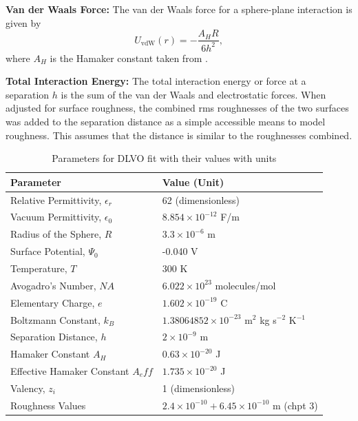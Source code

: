 \textbf{Van der Waals Force:} The van der Waals force for a sphere-plane interaction is given by
    \[
    U_{\text{vdW}}(r) = -\frac{A_H R}{6 h^2},
    \]
    where $A_H$ is the Hamaker constant taken from \cite{Bergstrom1997}.
    
\textbf{Total Interaction Energy:} The total interaction energy or force at a separation $h$ is the sum of the van der Waals and electrostatic forces. When adjusted for surface roughness, the combined rms roughnesses of the two surfaces was added to the separation distance as a simple accessible means to model roughness. This assumes that the distance is similar to the roughnesses combined. 

\begin{table}[h]
\centering
\begin{tabular}{|l|l|}
\hline
\textbf{Parameter} & \textbf{Value (Unit)} \\ \hline
Relative Permittivity, $\epsilon_r$ & 62 (dimensionless) \cite{behrends2006dielectric} \\ \hline
Vacuum Permittivity, $\epsilon_0$ & $8.854 \times 10^{-12}$ F/m \\ \hline
Radius of the Sphere, $R$ & $3.3 \times 10^{-6}$ m \\ \hline
Surface Potential, $\Psi_0$ & -0.040 V \cite{silica2021}\\ \hline
Temperature, $T$ & 300 K \\ \hline
Avogadro's Number, $NA$ & $6.022 \times 10^{23}$ molecules/mol \\ \hline
Elementary Charge, $e$ & $1.602 \times 10^{-19}$ C \\ \hline
Boltzmann Constant, $k_B$ & $1.38064852 \times 10^{-23}$ m\(^2\) kg s\(^{-2}\) K\(^{-1}\) \\ \hline
Separation Distance, $h$ & $2 \times 10^{-9}$ m \\ \hline
Hamaker Constant $A_H$ & $0.63 \times 10^{-20}$ J \cite{Bergstrom1997}\\ \hline
Effective Hamaker Constant $A_eff$ & $1.735 \times 10^{-20}$ J\\ \hline
Valency, $z_i$ & 1 (dimensionless) \\ \hline
Roughness Values & $2.4 \times 10^{-10} + 6.45 \times 10^{-10}$ m (chpt 3) \\ \hline
\end{tabular}
\caption{Parameters for DLVO fit with their values with units}
\label{table:parameters_units}
\end{table}



